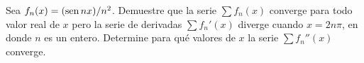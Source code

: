 \item Sea $f_n(x) = (\operatorname{sen} nx)/n^2$. Demuestre que la serie $\sum f_n(x)$ converge para todo valor real de $x$ pero la serie de derivadas $\sum f_n'(x)$ diverge cuando $x = 2n\pi$, en donde $n$ es un entero. Determine para qué valores de $x$ la serie $\sum f_n''(x)$ converge.
